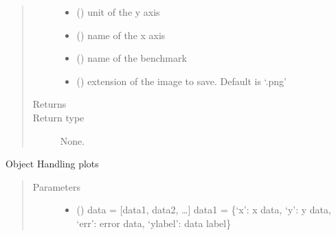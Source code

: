 \documentclass[letterpaper,10pt,english]{sphinxmanual}
\begin{document}
\begin{fulllineitems}
\begin{quote}
\begin{description}
\begin{itemize}
\item {} 
 () \textendash{} unit of the y axis

\item {} 
 () \textendash{} name of the x axis

\item {} 
 () \textendash{} name of the benchmark

\item {} 
 () \textendash{} extension of the image to save. Default is ‘.png’

\end{itemize}

\item[{Returns}] \leavevmode


\item[{Return type}] \leavevmode
None.

\end{description}\end{quote}

\begin{fulllineitems}
\label{\detokenize{api/postprocessing:plotter.Plotter.__init__}}
Object Handling plots
\begin{quote}\begin{description}
\item[{Parameters}] \leavevmode\begin{itemize}
\item {} 
 () \textendash{} data = {[}data1, data2, …{]}
data1 = \{‘x’: x data, ‘y’: y data, ‘err’: error data,
‘ylabel’: data label\}


\end{itemize}
\end{description}
\end{quote}
\end{fulllineitems}
\end{fulllineitems}
\end{document}
